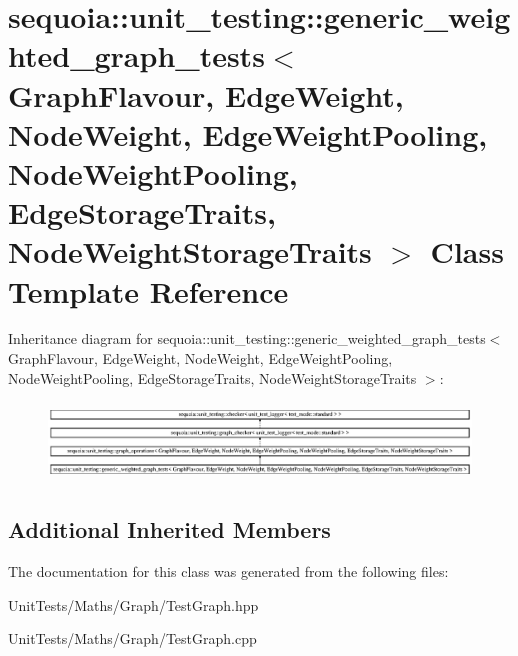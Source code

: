 \hypertarget{classsequoia_1_1unit__testing_1_1generic__weighted__graph__tests}{}\section{sequoia\+::unit\+\_\+testing\+::generic\+\_\+weighted\+\_\+graph\+\_\+tests$<$ Graph\+Flavour, Edge\+Weight, Node\+Weight, Edge\+Weight\+Pooling, Node\+Weight\+Pooling, Edge\+Storage\+Traits, Node\+Weight\+Storage\+Traits $>$ Class Template Reference}
\label{classsequoia_1_1unit__testing_1_1generic__weighted__graph__tests}
Inheritance diagram for sequoia\+::unit\+\_\+testing\+::generic\+\_\+weighted\+\_\+graph\+\_\+tests$<$ Graph\+Flavour, Edge\+Weight, Node\+Weight, Edge\+Weight\+Pooling, Node\+Weight\+Pooling, Edge\+Storage\+Traits, Node\+Weight\+Storage\+Traits $>$\+:\begin{figure}[H]
\begin{center}
\leavevmode
\includegraphics[height=2.097378cm]{classsequoia_1_1unit__testing_1_1generic__weighted__graph__tests}
\end{center}
\end{figure}
\subsection*{Additional Inherited Members}


The documentation for this class was generated from the following files\+:\begin{DoxyCompactItemize}
\item 
Unit\+Tests/\+Maths/\+Graph/Test\+Graph.\+hpp\item 
Unit\+Tests/\+Maths/\+Graph/Test\+Graph.\+cpp\end{DoxyCompactItemize}
